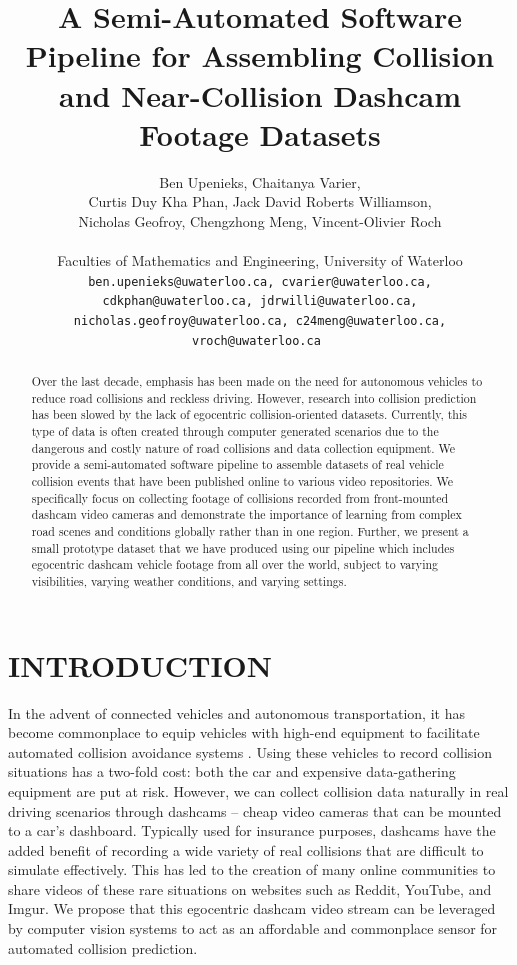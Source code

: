 \documentclass[letterpaper, 10 pt, conference]{ieeeconf}
\title{\LARGE \bf
A Semi-Automated Software Pipeline for Assembling Collision and Near-Collision Dashcam Footage Datasets
}
\author{
         Ben Upenieks, Chaitanya Varier,\\
         Curtis Duy Kha Phan, Jack David Roberts Williamson,\\
         Nicholas Geofroy, Chengzhong Meng, Vincent-Olivier Roch\\
         \\
         Faculties of Mathematics and Engineering, University of Waterloo\\
         \tt\small ben.upenieks@uwaterloo.ca, cvarier@uwaterloo.ca,
         \\ \tt\small cdkphan@uwaterloo.ca, jdrwilli@uwaterloo.ca,
         \\ \tt\small nicholas.geofroy@uwaterloo.ca, c24meng@uwaterloo.ca, vroch@uwaterloo.ca
}
\begin{document}
\maketitle
\thispagestyle{empty}
\pagestyle{empty}


\begin{abstract}

Over the last decade, emphasis has been made on the need for autonomous vehicles to reduce road collisions and reckless driving. However, research into collision prediction has been slowed by the lack of egocentric collision-oriented datasets. Currently, this type of data is often created through computer generated scenarios \cite{Kim_Lee_Hwang_Suh_2019} due to the dangerous and costly nature of road collisions and data collection equipment. We provide a semi-automated software pipeline to assemble datasets of real vehicle collision events that have been published online to various video repositories. We specifically focus on collecting footage of collisions recorded from front-mounted dashcam video cameras and demonstrate the importance of learning from complex road scenes and conditions globally rather than in one region. Further, we present a small prototype dataset that we have produced using our pipeline which includes egocentric dashcam vehicle footage from all over the world, subject to varying visibilities, varying weather conditions, and varying settings.

\end{abstract}

\section{INTRODUCTION}

In the advent of connected vehicles and autonomous transportation, it has become commonplace to equip vehicles with high-end equipment to facilitate automated collision avoidance systems \cite{Perumal2020LidarBI}.
Using these vehicles to record collision situations has a two-fold cost: both the car and expensive data-gathering equipment are put at risk.
However, we can collect collision data naturally in real driving scenarios through dashcams -- cheap video cameras that can be mounted to a car's dashboard.
Typically used for insurance purposes, dashcams have the added benefit of recording a wide variety of real collisions that are difficult to simulate effectively. 
This has led to the creation of many online communities to share videos of these rare situations on websites such as Reddit, YouTube, and Imgur.
We propose that this egocentric dashcam video stream can be leveraged by computer vision systems to act as an affordable and commonplace sensor for automated collision prediction. 
\end{document}
